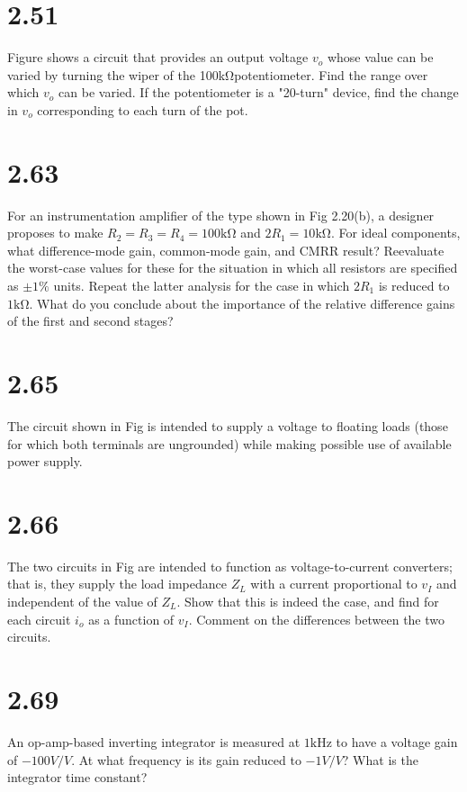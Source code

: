\documentclass[12pt, a4paper]{article}
\newcommand{\skom}{\si{\kilo\ohm}}
\begin{document}
\section{2.51}
Figure shows a circuit that provides an output voltage $v_o$ whose value can be varied by turning the wiper of the 100\skom potentiometer. Find the range over which $v_o$ can be varied. If the potentiometer is a "20-turn" device, find the change in $v_o$ corresponding to each turn of the pot.

\section{2.63}
For an instrumentation amplifier of the type shown in Fig 2.20(b), a designer proposes to make $R_2 = R_3 = R_4 = 100\skom$ and $2R_1 = 10\skom$. For ideal components, what difference-mode gain, common-mode gain, and CMRR result? Reevaluate the worst-case values for these for the situation in which all resistors are specified as $\pm 1\%$ units. Repeat the latter analysis for the case in which $2R_1$ is reduced to $1 \skom$. What do you conclude about the importance of the relative difference gains of the first and second stages?

\section{2.65}
The circuit shown in Fig is intended to supply a voltage to floating loads (those for which both terminals are ungrounded) while making possible use of available power supply.

\section{2.66}
The two circuits in Fig are intended to function as voltage-to-current converters; that is, they supply the load impedance $Z_L$ with a current proportional to $v_I$ and independent of the value of $Z_L$. Show that this is indeed the case, and find for each circuit $i_o$ as a function of $v_I$. Comment on the differences between the two circuits.

\section{2.69}
An op-amp-based inverting integrator is measured at $1 \si{\kilo\hertz}$ to have a voltage gain of $-100\si{V/V}$. At what frequency is its gain reduced to $-1 \si{V/V}$? What is the integrator time constant?
\end{document}

